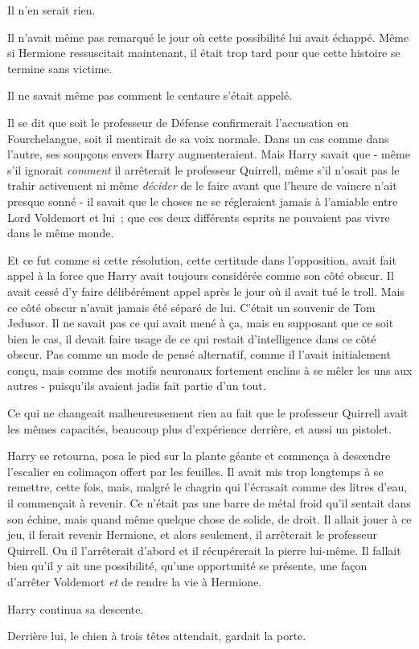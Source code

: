 Il n'en serait rien.

Il n'avait même pas remarqué le jour où cette possibilité lui avait échappé. Même si Hermione ressuscitait maintenant, il était trop tard pour que cette histoire se termine sans victime.

Il ne savait même pas comment le centaure s'était appelé.

Il se dit que soit le professeur de Défense confirmerait l'accusation en Fourchelangue, soit il mentirait de sa voix normale. Dans un cas comme dans l'autre, ses soupçons envers Harry augmenteraient. Mais Harry savait que - même s'il ignorait \emph{comment} il arrêterait le professeur Quirrell, même s'il n'osait pas le trahir activement ni même \emph{décider} de le faire avant que l'heure de vaincre n'ait presque sonné - il savait que le choses ne se régleraient jamais à l'amiable entre Lord Voldemort et lui~; que ces deux différents esprits ne pouvaient pas vivre dans le même monde.

Et ce fut comme si cette résolution, cette certitude dans l'opposition, avait fait appel à la force que Harry avait toujours considérée comme son côté obscur. Il avait cessé d'y faire délibérément appel après le jour où il avait tué le troll. Mais ce côté obscur n'avait jamais été séparé de lui. C'était un souvenir de Tom Jedusor. Il ne savait pas ce qui avait mené à ça, mais en supposant que ce soit bien le cas, il devait faire usage de ce qui restait d'intelligence dans ce côté obscur. Pas comme un mode de pensé alternatif, comme il l'avait initialement conçu, mais comme des motifs neuronaux fortement enclins à se mêler les uns aux autres - puisqu'ils avaient jadis fait partie d'un tout.

Ce qui ne changeait malheureusement rien au fait que le professeur Quirrell avait les mêmes capacités, beaucoup plus d'expérience derrière, et aussi un pistolet.

Harry se retourna, posa le pied sur la plante géante et commença à descendre l'escalier en colimaçon offert par les feuilles. Il avait mis trop longtemps à se remettre, cette fois, mais, malgré le chagrin qui l'écrasait comme des litres d'eau, il commençait à revenir. Ce n'était pas une barre de métal froid qu'il sentait dans son échine, mais quand même quelque chose de solide, de droit. Il allait jouer à ce jeu, il ferait revenir Hermione, et alors seulement, il arrêterait le professeur Quirrell. Ou il l'arrêterait d'abord et il récupérerait la pierre lui-même. Il fallait bien qu'il y ait une possibilité, qu'une opportunité se présente, une façon d'arrêter Voldemort \emph{et} de rendre la vie à Hermione.

Harry continua sa descente.

Derrière lui, le chien à trois têtes attendait, gardait la porte.
